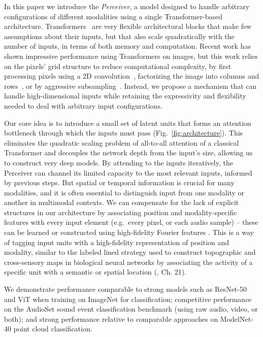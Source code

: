 \documentclass{article}
\begin{document}
In this paper we introduce the \textit{Perceiver}, a model designed to handle arbitrary configurations of different modalities using a single Transformer-based architecture. Transformers~\cite{vaswani2017attention} are very flexible architectural blocks that make few assumptions about their inputs, but that also scale quadratically with the number of inputs, in terms of both memory and computation. Recent work has shown impressive performance using Transformers on images, but this work relies on the pixels' grid structure to reduce computational complexity, by first processing pixels using a 2D convolution~\cite{dosovitskiy2020image,touvron2020training}, factorizing the image into columns and rows~\cite{ho2019axial, child2019generating}, or by aggressive subsampling~\cite{chen2020generative}. Instead, we propose a mechanism that can handle high-dimensional inputs while retaining the expressivity and flexibility needed to deal with arbitrary input configurations.

Our core idea is to introduce a small set of latent units that forms an attention bottleneck through which the inputs must pass (Fig.~\ref{fig:architecture}). This eliminates the quadratic scaling problem of all-to-all attention of a classical Transformer and decouples the network depth from the input's size, allowing us to construct very deep models.
By attending to the inputs iteratively, the Perceiver can channel its limited capacity to the most relevant inputs, informed by previous steps. But spatial or temporal information is crucial for many modalities, and it is often essential to distinguish input from one modality or another in multimodal contexts. We can compensate for the lack of explicit structures in our architecture by associating position and modality-specific features with every input element (e.g.\ every pixel, or each audio sample) -- these can be learned or constructed using high-fidelity Fourier features \cite{mildenhall2020nerf, tancik2020fourier, vaswani2017attention}. This is a way of tagging input units with a high-fidelity representation of position and modality, similar to the labeled lined strategy used to construct topographic and cross-sensory maps in biological neural networks by associating the activity of a specific unit with a semantic or spatial location (\citealt{kandel2012principles}, Ch. 21).

We demonstrate performance comparable to strong models such as ResNet-50 and ViT when training on ImageNet for classification; competitive performance on the AudioSet sound event classification benchmark (using raw audio, video, or both); and strong performance relative to comparable approaches on ModelNet-40 point cloud classification. 
\end{document}
